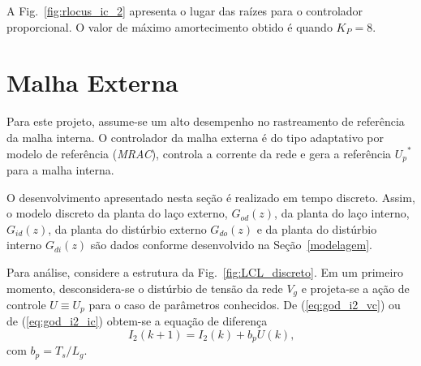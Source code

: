     A Fig.~\ref{fig:rlocus_ic_2} apresenta o lugar das raízes para o controlador proporcional. O valor de máximo amortecimento obtido é quando $K_P = 8$.


\section{Malha Externa}

    Para este projeto, assume-se um alto desempenho no rastreamento de referência da malha interna. O controlador da malha externa é do tipo adaptativo por modelo de referência (\emph{MRAC}), controla a corrente da rede e gera a referência ${U_p}^*$ para a malha interna.

    O desenvolvimento apresentado nesta seção é realizado em tempo discreto. Assim, o modelo discreto da planta do laço externo, $G_{od}(z)$, da planta do laço interno, $G_{id}(z)$, da planta do distúrbio externo $G_{do}(z)$ e da planta do distúrbio interno $G_{di}(z)$ são dados conforme desenvolvido na Seção~\ref{modelagem}.

    Para análise, considere a estrutura da Fig.~\ref{fig:LCL_discreto}. Em um primeiro momento, desconsidera-se o distúrbio de tensão da rede $V_g$ e projeta-se a ação de controle $U \equiv U_p$ para o caso de parâmetros conhecidos. %
    De (\ref{eq:god_i2_vc}) ou de (\ref{eq:god_i2_ic}) obtem-se a equação de diferença
    \begin{equation}
        I_2 (k + 1) = I_2 (k) + b_p U (k) \text{,}
        \label{eq:diferenca}
    \end{equation}
    com $b_p = T_s / L_g$.

